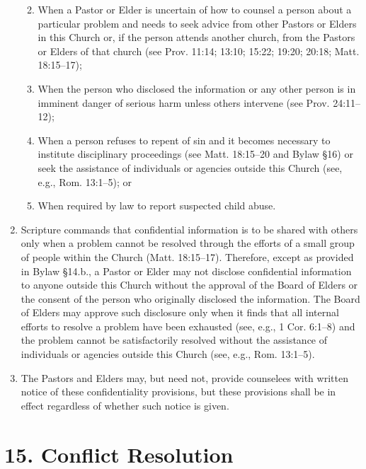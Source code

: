 \documentclass[
]{book}
\providecommand{\tightlist}{%
  \setlength{\itemsep}{0pt}\setlength{\parskip}{0pt}}
\begin{document}
\begin{enumerate}
  \begin{enumerate}
  \def\labelenumii{(\arabic{enumii})}
  \tightlist
  \item
    When a Pastor or Elder is uncertain of how to counsel a person about a particular problem and needs to seek advice from other Pastors or Elders in this Church or, if the person attends another church, from the Pastors or Elders of that church (see Prov. 11:14; 13:10; 15:22; 19:20; 20:18; Matt. 18:15--17);
  \item
    When the person who disclosed the information or any other person is in imminent danger of serious harm unless others intervene (see Prov. 24:11--12);
  \item
    When a person refuses to repent of sin and it becomes necessary to institute disciplinary proceedings (see Matt. 18:15--20 and Bylaw §16) or seek the assistance of individuals or agencies outside this Church (see, e.g., Rom. 13:1--5); or
  \item
    When required by law to report suspected child abuse.
  \end{enumerate}
\item
  Scripture commands that confidential information is to be shared with others only when a problem cannot be resolved through the efforts of a small group of people within the Church (Matt. 18:15--17). Therefore, except as provided in Bylaw §14.b., a Pastor or Elder may not disclose confidential information to anyone outside this Church without the approval of the Board of Elders or the consent of the person who originally disclosed the information. The Board of Elders may approve such disclosure only when it finds that all internal efforts to resolve a problem have been exhausted (see, e.g., 1 Cor. 6:1--8) and the problem cannot be satisfactorily resolved without the assistance of individuals or agencies outside this Church (see, e.g., Rom. 13:1--5).
\item
  The Pastors and Elders may, but need not, provide counselees with written notice of these confidentiality provisions, but these provisions shall be in effect regardless of whether such notice is given.
\end{enumerate}

\hypertarget{conflict-resolution}{%
\section*{15. Conflict Resolution}\label{conflict-resolution}}
\end{document}
